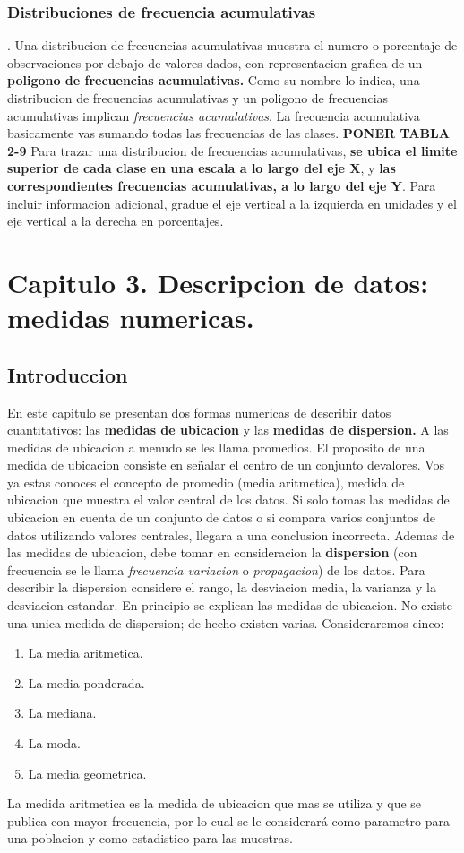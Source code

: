 \documentclass[]{article}
\begin{document}
\subsubsection*{Distribuciones de frecuencia acumulativas}.
Una distribucion de frecuencias acumulativas muestra el numero o porcentaje de observaciones por debajo de valores dados, con representacion grafica de un \textbf{poligono de frecuencias acumulativas.} Como su nombre lo indica, una distribucion de frecuencias acumulativas y un poligono de frecuencias acumulativas implican \textit{frecuencias acumulativas}. La frecuencia acumulativa basicamente vas sumando todas las frecuencias de las clases. \textbf{PONER TABLA 2-9}
Para trazar una distribucion de frecuencias acumulativas, \textbf{se ubica el limite superior de cada clase en una escala a lo largo del eje X}, y \textbf{las correspondientes frecuencias acumulativas, a lo largo del eje Y}. Para incluir informacion adicional, gradue el eje vertical a la izquierda en unidades y el eje vertical a la derecha en porcentajes.
\section{Capitulo 3. Descripcion de datos: medidas numericas.}
\subsection{Introduccion}
En este capitulo se presentan dos formas numericas de describir datos cuantitativos: las \textbf{medidas de ubicacion} y las \textbf{medidas de dispersion.} A las medidas de ubicacion a menudo se les llama promedios. El proposito de una medida de ubicacion consiste en señalar el centro de un conjunto devalores. Vos ya estas conoces el concepto de promedio (media aritmetica), medida de ubicacion que muestra el valor central de los datos. Si solo tomas las medidas de ubicacion en cuenta de un conjunto de datos o si compara varios conjuntos de datos utilizando valores centrales, llegara a una conclusion incorrecta. Ademas de las medidas de ubicacion, debe tomar en consideracion la \textbf{dispersion} (con frecuencia se le llama \textit{frecuencia variacion }o \textit{propagacion}) de los datos. Para describir la dispersion considere el rango, la desviacion media, la varianza y la desviacion estandar. En principio se explican las medidas de ubicacion. No existe una unica medida de dispersion; de hecho existen varias. Consideraremos cinco:
\begin{enumerate}
	\item La media aritmetica.
	\item La media ponderada.
	\item La mediana.
	\item La moda.
	\item La media geometrica.
\end{enumerate}
La medida aritmetica es la medida de ubicacion que mas se utiliza y que se publica con mayor frecuencia, por lo cual se le considerará como parametro para una poblacion y como estadistico para las muestras.
\end{document}

